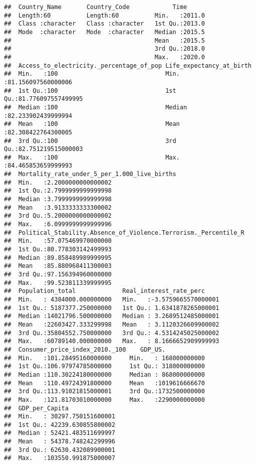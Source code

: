 \documentclass[
]{article}
\begin{document}
\begin{verbatim}
##  Country_Name       Country_Code            Time       
##  Length:60          Length:60          Min.   :2011.0  
##  Class :character   Class :character   1st Qu.:2013.0  
##  Mode  :character   Mode  :character   Median :2015.5  
##                                        Mean   :2015.5  
##                                        3rd Qu.:2018.0  
##                                        Max.   :2020.0  
##  Access_to_electricity._percentage_of_pop Life_expectancy_at_birth    
##  Min.   :100                              Min.   :81.156097560000006  
##  1st Qu.:100                              1st Qu.:81.776097557499995  
##  Median :100                              Median :82.233902439999994  
##  Mean   :100                              Mean   :82.308422764300005  
##  3rd Qu.:100                              3rd Qu.:82.751219515000003  
##  Max.   :100                              Max.   :84.465853659999993  
##  Mortality_rate_under_5_per_1.000_live_births
##  Min.   :2.2000000000000002                  
##  1st Qu.:2.7999999999999998                  
##  Median :3.7999999999999998                  
##  Mean   :3.9133333333300002                  
##  3rd Qu.:5.2000000000000002                  
##  Max.   :6.0999999999999996                  
##  Political_Stability.Absence_of_Violence.Terrorism._Percentile_R
##  Min.   :57.075469970000000                                     
##  1st Qu.:80.778303142499993                                     
##  Median :89.858489989999995                                     
##  Mean   :85.880968411300003                                     
##  3rd Qu.:97.156394960000000                                     
##  Max.   :99.523811339999995                                     
##  Population_total             Real_interest_rate_perc      
##  Min.   : 4384000.000000000   Min.   :-3.5759665570000001  
##  1st Qu.: 5187377.250000000   1st Qu.: 1.6341878265000001  
##  Median :14021796.500000000   Median : 3.2689512485000001  
##  Mean   :22603427.333299998   Mean   : 3.1120326609900002  
##  3rd Qu.:35804552.750000000   3rd Qu.: 4.5314245025000002  
##  Max.   :60789140.000000000   Max.   : 8.1666652909999993  
##  Consumer_price_index_2010._100    GDP_US.             
##  Min.   :101.28495160000000     Min.   : 168000000000  
##  1st Qu.:106.97974785000000     1st Qu.: 318000000000  
##  Median :110.30224180000000     Median : 868000000000  
##  Mean   :110.49724391800000     Mean   :1019616666670  
##  3rd Qu.:113.91021815000001     3rd Qu.:1732500000000  
##  Max.   :121.81703010000000     Max.   :2290000000000  
##  GDP_per_Capita               
##  Min.   : 30297.750151600001  
##  1st Qu.: 42239.630855800002  
##  Median : 52421.483511699997  
##  Mean   : 54378.748242299996  
##  3rd Qu.: 62630.432089900001  
##  Max.   :103550.991875000007
\end{verbatim}
\end{document}

